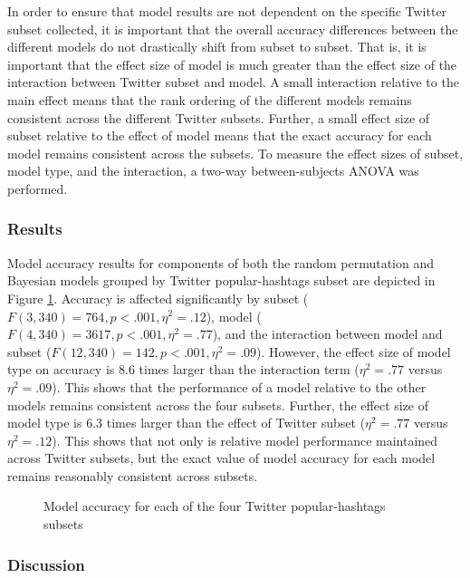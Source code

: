 \documentclass[man,floatsintext,donotrepeattitle]{apa6}
\begin{document}
In order to ensure that model results are not dependent on the specific Twitter subset collected,
it is important that the overall accuracy differences between the different models do not drastically shift from subset to subset.
That is, it is important that the effect size of model is much greater than the effect size of the interaction between Twitter subset and model.
A small interaction relative to the main effect means that the rank ordering of the different models remains consistent across the different Twitter subsets.
Further, a small effect size of subset relative to the effect of model means that the exact accuracy for each model remains consistent across the subsets.
To measure the effect sizes of subset, model type, and the interaction, a two-way between-subjects ANOVA was performed.

\subsubsection{Results}

Model accuracy results for components of both the random permutation and Bayesian models grouped by Twitter popular-hashtags subset are depicted in Figure \ref{figContextSubsets}.
Accuracy is affected significantly by subset ($F(3, 340) = 764, p < .001, \eta ^ {2} = .12$), model ($F(4, 340) = 3617, p < .001, \eta ^ {2} = .77$),
and the interaction between model and subset ($F(12, 340) = 142, p < .001, \eta ^ {2} = .09$).
However, the effect size of model type on accuracy is \num{8.6} times larger than the interaction term ($\eta ^ {2} = .77$ versus $\eta ^ {2} = .09$).
This shows that the performance of a model relative to the other models remains consistent across the four subsets.
Further, the effect size of model type is \num{6.3} times larger than the effect of Twitter subset ($\eta ^ {2} = .77$ versus $\eta ^ {2} = .12$).
This shows that not only is relative model performance maintained across Twitter subsets, but the exact value of model accuracy for each model remains reasonably consistent across subsets.

\begin{figure}[!htbp]
  \caption{Model accuracy for each of the four Twitter popular-hashtags subsets}
  \label{figContextSubsets}
\end{figure}

\subsubsection{Discussion}
\end{document}
